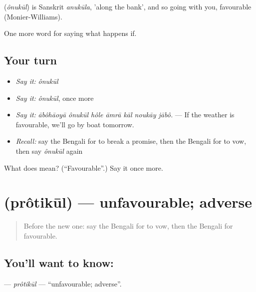 \begin{cousinweb}
\textbf{} (\emph{ônukūl}) is Sanskrit \emph{anukūla}, 'along the bank', and so going with you, favourable (Monier-Williams).
\end{cousinweb}

\begin{grammarlens}[title={What you've built}]
One more word for saying what happens if.
\end{grammarlens}

\subsection*{Your turn}
\begin{itemize}
\raggedright
  \item \emph{Say it:} \emph{ônukūl}
  \item \emph{Say it:} \emph{ônukūl}, once more
  \item \emph{Say it:} \emph{ābôhāoyā ônukūl hôle āmrā kāl noukāy jābô.} — If the weather is favourable, we'll go by boat tomorrow.
  \item \emph{Recall:} say the Bengali for to break a promise, then the Bengali for to vow, then say \emph{ônukūl} again
\end{itemize}

\begin{tcolorbox}[breakable,colback=teal!4,colframe=teal!35!black,title={Before you move on}]
What does  mean? (\textquotedblleft{}Favourable\textquotedblright{}.) Say it once more.
\end{tcolorbox}
\section[\texorpdfstring{\bn{প্রতিকূল} (prôtikūl)}{প্রতিকূল (prôtikūl)}]{ (prôtikūl) — unfavourable; adverse}

\label{lesson:BN-C380-protikul}



\begin{quote}
Before the new one: say the Bengali for to vow, then the Bengali for favourable.
\end{quote}

\subsection*{You'll want to know: }
\textbf{} — \emph{prôtikūl} — \textquotedblleft{}unfavourable; adverse\textquotedblright{}.

